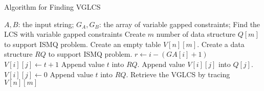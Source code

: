 \begin{algorithm}[!thb]
  \caption{Algorithm for Finding VGLCS~\cite{Peng2011TheLC}}
  \label{alg:serial-VGLCS}
  \begin{algorithmic}[1]
    \Require
      $A, B$: the input string;
      $G_A, G_B$: the array of variable gapped constraints;
    \Ensure Find the LCS with variable gapped constraints
    \State Create $m$ number of data structure $Q[m]$ to support ISMQ problem.
    \State Create an empty table $V[n][m]$.
      \State Create a data structure $RQ$ to support ISMQ problem.
      \State $r \gets i - (GA[i]+1)$
            \State {}
            \State $V[i][j] \gets t + 1$
            \State {}
            \State Append value $t$ into $RQ$.
            \State Append value $V[i][j]$ into $Q[j]$.
        \Else
            \State $V[i][j] \gets 0$
            \State {}
            \State Append value $t$ into $RQ$.
        \EndIf
      \EndFor
    \EndFor
    \State Retrieve the VGLCS by tracing $V[n][m]$
  \end{algorithmic}
\end{algorithm}
